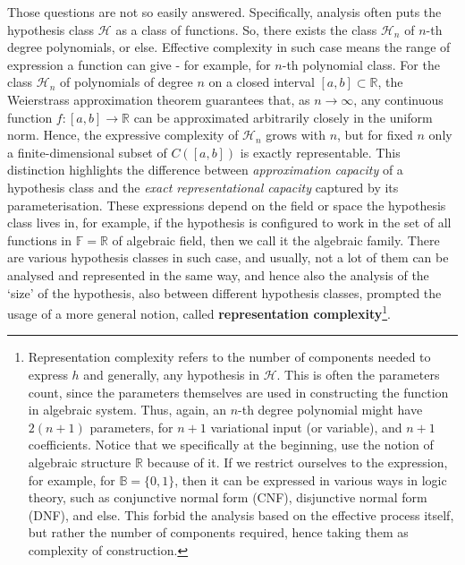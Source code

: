 \documentclass[10pt]{article} %
\begin{document}
Those questions are not so easily answered. Specifically, analysis often puts the hypothesis class $\mathcal{H}$ as a class of functions. So, there exists the class $\mathcal{H}_{n}$ of $n$-th degree polynomials, or else. Effective complexity in such case means the range of expression a function can give - for example, for $n$-th polynomial class. For the class $\mathcal{H}_n$ of polynomials of degree $n$ on a closed interval $[a,b]\subset \mathbb{R}$, the Weierstrass approximation theorem guarantees that, as $n\to \infty$, any continuous function $f:[a,b]\to \mathbb{R}$ can be approximated arbitrarily closely in the uniform norm. Hence, the expressive complexity of $\mathcal{H}_n$ grows with $n$, but for fixed $n$ only a finite-dimensional subset of $C([a,b])$ is exactly representable. This distinction highlights the difference between \emph{approximation capacity} of a hypothesis class and the \emph{exact representational capacity} captured by its parameterisation. These expressions depend on the field or space the hypothesis class lives in, for example, if the hypothesis is configured to work in the set of all functions in $\mathbb{F}=\mathbb{R}$ of algebraic field, then we call it the algebraic family. There are various hypothesis classes in such case, and usually, not a lot of them can be analysed and represented in the same way, and hence also the analysis of the `size' of the hypothesis, also between different hypothesis classes, prompted the usage of a more general notion, called \textbf{representation complexity}\footnote{Representation complexity refers to the number of components needed to express $h$ and generally, any hypothesis in $\mathcal{H}$. This is often the parameters count, since the parameters themselves are used in constructing the function in algebraic system. Thus, again, an $n$-th degree polynomial might have $2(n+1)$ parameters, for $n+1$ variational input (or variable), and $n+1$ coefficients. Notice that we specifically at the beginning, use the notion of algebraic structure $\mathbb{R}$ because of it. If we restrict ourselves to the expression, for example, for $\mathbb{B}=\{0,1\}$, then it can be expressed in various ways in logic theory, such as conjunctive normal form (CNF), disjunctive normal form (DNF), and else. This forbid the analysis based on the effective process itself, but rather the number of components required, hence taking them as complexity of construction.}.
\end{document}

